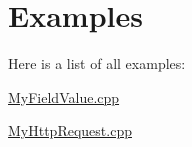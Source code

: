 \section{Examples}
Here is a list of all examples\+:\begin{DoxyCompactItemize}
\item 
\mbox{\hyperlink{MyFieldValue_8cpp-example}{My\+Field\+Value.\+cpp}}
\item 
\mbox{\hyperlink{MyHttpRequest_8cpp-example}{My\+Http\+Request.\+cpp}}
\end{DoxyCompactItemize}
